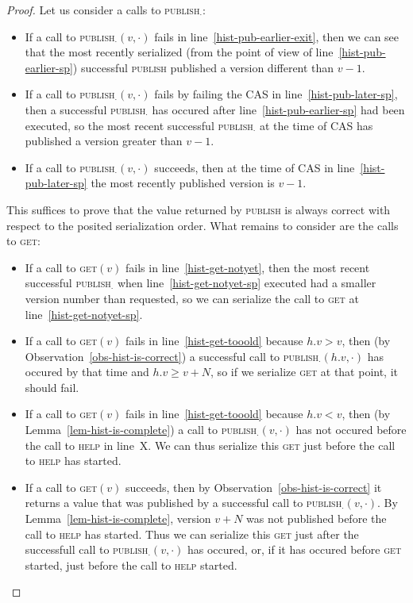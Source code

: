 \documentclass{thesis}
\newcommand{\fn}[1]{\textsc{#1}}
\begin{document}
\begin{proof}
Let us consider a calls to \fn{publish$_\cdot$}:
\begin{itemize}
\item If a call to \fn{publish$_\cdot$}$(v, \cdot)$ fails in line~\ref{hist-pub-earlier-exit}, then we can see that the most recently serialized (from the point of view of line~\ref{hist-pub-earlier-sp}) successful \fn{publish} published a version different than $v-1$.
\item If a call to \fn{publish$_\cdot$}$(v, \cdot)$ fails by failing the CAS in line~\ref{hist-pub-later-sp}, then a successful \fn{publish$_\cdot$} has occured after line~\ref{hist-pub-earlier-sp} had been executed, so the most recent successful \fn{publish$_\cdot$} at the time of \fn{CAS} has published a version greater than $v-1$.
\item If a call to \fn{publish$_\cdot$}$(v, \cdot)$ succeeds, then at the time of CAS in line~\ref{hist-pub-later-sp} the most recently published version is $v-1$.
	\end{itemize}
	This suffices to prove that the value returned by \fn{publish} is always correct with respect to the posited
	serialization order. What remains to consider are the calls to \fn{get}:
\begin{itemize}
	\item If a call to \fn{get}$(v)$ fails in line~\ref{hist-get-notyet}, then the most recent successful \fn{publish$_\cdot$} when line~\ref{hist-get-notyet-sp} executed had a smaller version number than requested, so we can serialize the call to \fn{get} at line~\ref{hist-get-notyet-sp}.
	\item If a call to \fn{get}$(v)$ fails in line~\ref{hist-get-tooold} because $h.v > v$, then (by Observation~\ref{obs-hist-is-correct}) a successful call to \fn{publish$_\cdot$}$(h.v, \cdot)$ has occured by that time and $h.v \geq v+N$, so if we serialize \fn{get} at that point, it should fail.
	\item If a call to \fn{get}$(v)$ fails in line~\ref{hist-get-tooold} because $h.v < v$, then (by Lemma~\ref{lem-hist-is-complete}) a call to \fn{publish$_\cdot$}$(v, \cdot)$ has not occured before the call to \fn{help} in line~X. We can thus serialize this \fn{get} just before the call to \fn{help} has started.
	\item If a call to \fn{get}$(v)$ succeeds, then by Observation~\ref{obs-hist-is-correct} it returns a value that was published by a successful call to \fn{publish$_\cdot$}$(v, \cdot)$. By Lemma~\ref{lem-hist-is-complete}, version $v+N$ was not published before the call to \fn{help} has started. Thus we can serialize this \fn{get} just after the successfull call to \fn{publish$_\cdot$}$(v, \cdot)$ has occured, or, if it has occured before \fn{get} started, just before the call to \fn{help} started.
\end{itemize}
\end{proof}
\end{document}
